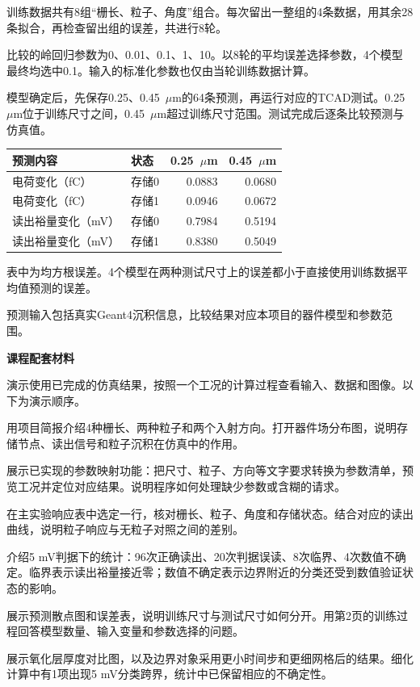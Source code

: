 \documentclass[UTF8,fontset=fandol,11pt,a4paper]{ctexart}
\newcommand{\titleline}[1]{{\small\bfseries\color{blue}课程配套材料}\par\vspace{6pt}{\LARGE\bfseries #1}\par\vspace{8pt}}
\newcommand{\parttitle}[1]{\par\vspace{10pt}{\large\bfseries #1}\par\vspace{3pt}}
\newcommand{\smallnote}[1]{\par{\small\color{muted}#1}\par}
\begin{document}
\parttitle{训练参数的选择}
训练数据共有8组“栅长、粒子、角度”组合。每次留出一整组的4条数据，用其余28条拟合，再检查留出组的误差，共进行8轮。

比较的岭回归参数为0、0.01、0.1、1、10。以8轮的平均误差选择参数，4个模型最终均选中0.1。输入的标准化参数也仅由当轮训练数据计算。

\parttitle{新尺寸测试}
模型确定后，先保存0.25、0.45~$\mu$m的64条预测，再运行对应的TCAD测试。0.25~$\mu$m位于训练尺寸之间，0.45~$\mu$m超过训练尺寸范围。测试完成后逐条比较预测与仿真值。

\begin{tabularx}{\textwidth}{@{}Xlrr@{}}\toprule
预测内容 & 状态 & 0.25~$\mu$m & 0.45~$\mu$m\\\midrule
电荷变化（fC） & 存储0 & 0.0883 & 0.0680\\
电荷变化（fC） & 存储1 & 0.0946 & 0.0672\\
读出裕量变化（mV） & 存储0 & 0.7984 & 0.5194\\
读出裕量变化（mV） & 存储1 & 0.8380 & 0.5049\\\bottomrule
\end{tabularx}
\smallnote{表中为均方根误差。4个模型在两种测试尺寸上的误差都小于直接使用训练数据平均值预测的误差。}
\vfill
\smallnote{预测输入包括真实Geant4沉积信息，比较结果对应本项目的器件模型和参数范围。}

\newpage
\titleline{作品演示安排}
演示使用已完成的仿真结果，按照一个工况的计算过程查看输入、数据和图像。以下为演示顺序。

\parttitle{1\quad 参数与模型}
用项目简报介绍4种栅长、两种粒子和两个入射方向。打开器件场分布图，说明存储节点、读出信号和粒子沉积在仿真中的作用。

\parttitle{2\quad 自然语言参数设置}
展示已实现的参数映射功能：把尺寸、粒子、方向等文字要求转换为参数清单，预览工况并定位对应结果。说明程序如何处理缺少参数或含糊的请求。

\parttitle{3\quad 一组仿真数据}
在主实验响应表中选定一行，核对栅长、粒子、角度和存储状态。结合对应的读出曲线，说明粒子响应与无粒子对照之间的差别。

\parttitle{4\quad 读出结果}
介绍5 mV判据下的统计：96次正确读出、20次判据误读、8次临界、4次数值不确定。临界表示读出裕量接近零；数值不确定表示边界附近的分类还受到数值验证状态的影响。

\parttitle{5\quad 预测与仿真比较}
展示预测散点图和误差表，说明训练尺寸与测试尺寸如何分开。用第2页的训练过程回答模型数量、输入变量和参数选择的问题。

\parttitle{6\quad 补充验证}
展示氧化层厚度对比图，以及边界对象采用更小时间步和更细网格后的结果。细化计算中有1项出现5 mV分类跨界，统计中已保留相应的不确定性。
\end{document}
